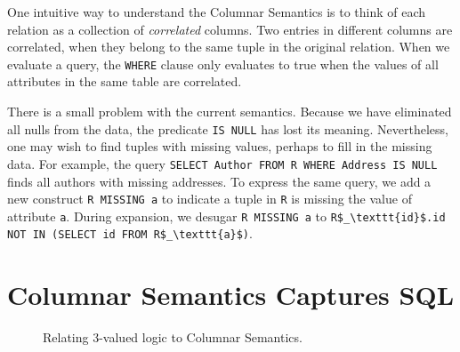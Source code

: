 \documentclass[sigconf]{acmart}
\begin{document}
One intuitive way to understand the Columnar Semantics 
 is to think of each relation as a collection of {\em correlated} columns.
Two entries in different columns are correlated, 
 when they belong to the same tuple in the original relation.
When we evaluate a query, the \lstinline|WHERE| clause 
 only evaluates to true when the values of all attributes
 in the same table are correlated.

There is a small problem with the current semantics.
Because we have eliminated all nulls from the data, 
 the predicate \lstinline|IS NULL| has lost its meaning.
Nevertheless, one may wish to find tuples with missing values,
 perhaps to fill in the missing data.
For example, the query 
\lstinline|SELECT Author FROM R WHERE Address IS NULL|
finds all authors with missing addresses.
To express the same query, 
 we add a new construct \lstinline|R MISSING a|
 to indicate a tuple in \lstinline|R|
 is missing the value of attribute \lstinline|a|.
During expansion, we desugar \lstinline|R MISSING a|
 to \lstinline|R$_\texttt{id}$.id NOT IN (SELECT id FROM R$_\texttt{a}$)|.

\section{Columnar Semantics Captures SQL}
\label{sec:cv3}

\begin{figure}
\begin{subfigure}{0.49\linewidth}
\centering
{}
\end{subfigure}
\begin{subfigure}{0.49\linewidth}
\centering
{}
\end{subfigure}
\caption{Relating 3-valued logic to Columnar Semantics.}
\label{fig:3vl-cs}
\end{figure}
\end{document}

